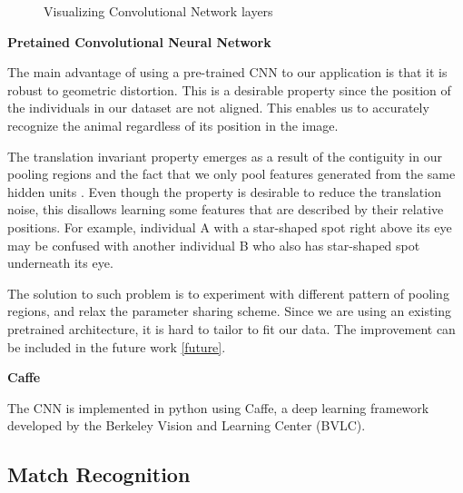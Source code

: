 \begin{figure}[h!]
  \captionsetup{justification=centering}
  \caption{Visualizing Convolutional Network layers}
\end{figure}


\textbf{Pretained Convolutional Neural Network}

The main advantage of using a pre-trained CNN to our application is that it is
robust to geometric distortion. This is a desirable property since the position
of the individuals in our dataset are not aligned. This enables us to
accurately recognize the animal regardless of its position in the image. 

The translation invariant property emerges as a result of the contiguity in our
pooling regions and the fact that we only pool features generated from the same
hidden units \cite{ufldl}. Even though the property is desirable to reduce the
translation noise, this disallows learning some features that are described by
their relative positions. For example, individual A with a star-shaped spot
right above its eye may be confused with another individual B who also has
star-shaped spot underneath its eye. 

The solution to such problem is to experiment with different pattern of pooling
regions, and relax the parameter sharing scheme. Since we are using an existing
pretrained architecture, it is hard to tailor to fit our data. The improvement
can be included in the future work \ref{future}.

\textbf{Caffe}

The CNN is implemented in python using Caffe\cite{caffe}, a deep learning
framework developed by the Berkeley Vision and Learning Center (BVLC).

\subsection{Match Recognition}

